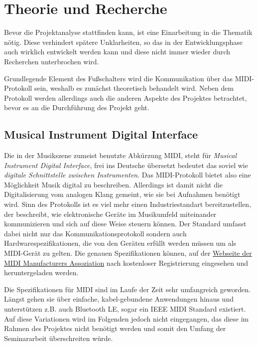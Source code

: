 \chapter{Theorie und Recherche}
\label{chap:theorieundrecherche}

Bevor die Projektanalyse stattfinden kann, ist eine Einarbeitung in die Thematik nötig. Diese verhindert spätere Unklarheiten, so das in der Entwicklungsphase auch wirklich entwickelt werden kann und diese nicht immer wieder durch Recherchen unterbrochen wird. 

Grundlegende Element des Fußschalters wird die Kommunikation über das MIDI-Protokoll sein, weshalb es zunächst theoretisch behandelt wird. Neben dem Protokoll werden allerdings auch die anderen Aspekte des Projektes betrachtet, bevor es an die Durchführung des Projekt geht.

\section{Musical Instrument Digital Interface}
\label{section:midi}
Die in der Musikszene zumeist benutzte Abkürzung MIDI, steht für \emph{Musical Instrument Digital Interface}, frei ins Deutsche übersetzt bedeutet das soviel wie \emph{digitale Schnittstelle zwischen Instrumenten}. Das MIDI-Protokoll bietet also eine Möglichkeit Musik digital zu beschreiben. Allerdings ist damit nicht die Digitalisierung vom analogen Klang gemeint, wie sie bei Aufnahmen benötigt wird. Sinn des Protokolls ist es viel mehr einen Industriestandart bereitzustellen, der beschreibt, wie elektronische Geräte im Musikumfeld miteinander kommunizieren und sich auf diese Weise steuern können. Der Standard umfasst dabei nicht nur das Kommunikationsprotokoll sondern auch Hardwarespezifikationen, die von den Geräten erfüllt werden müssen um als MIDI-Gerät zu gelten. Die genauen Spezifikationen können, auf der  \href{https://www.midi.org/specifications}{Webseite der MIDI Manufacturers Assoziation} nach kostenloser Registrierung eingesehen und heruntergeladen werden. 

Die Spezifikationen für MIDI sind im Laufe der Zeit sehr umfangreich geworden. Längst gehen sie über einfache, kabel-gebundene Anwendungen hinaus und unterstützen z.B. auch Bluetooth LE, sogar ein IEEE MIDI Standard existiert. Auf diese Variationen wird im Folgenden jedoch nicht eingegangen, das diese im Rahmen des Projektes nicht benötigt werden und somit den Umfang der Seminararbeit überschreiten würde.  

